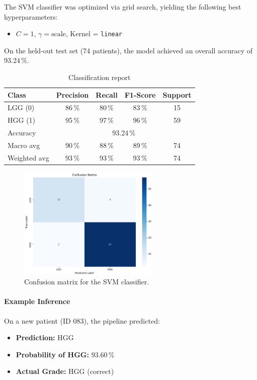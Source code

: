 The SVM classifier was optimized via grid search, yielding the following best hyperparameters:
\begin{itemize}
  \item \(C = 1\), \(\gamma = \text{scale}\), Kernel = \texttt{linear}
\end{itemize}
On the held‐out test set (74 patients), the model achieved an overall accuracy of 93.24\,\%.


\begin{table}[ht]
  \centering
  \caption{Classification report}
  \label{tab:svm-report}
  \begin{tabular}{lcccc}
    \hline
    Class        & Precision                     & Recall & F1-Score & Support \\
    \hline
    LGG (0)      & 86\,\%                        & 80\,\% & 83\,\%   & 15      \\
    HGG (1)      & 95\,\%                        & 97\,\% & 96\,\%   & 59      \\
    \hline
    Accuracy     & \multicolumn{4}{c}{93.24\,\%}                               \\
    Macro avg    & 90\,\%                        & 88\,\% & 89\,\%   & 74      \\
    Weighted avg & 93\,\%                        & 93\,\% & 93\,\%   & 74      \\
    \hline
  \end{tabular}
\end{table}

\begin{figure}[H]
  \centering
  \includegraphics[width=0.6\textwidth]{Images/Chapter3/confusion.png}
  \caption{Confusion matrix for the SVM classifier.}
  \label{fig:confusion}
\end{figure}

\paragraph{Example Inference}
On a new patient (ID 083), the pipeline predicted:
\begin{itemize}
  \item \textbf{Prediction:} HGG
  \item \textbf{Probability of HGG:} 93.60\,\%
  \item \textbf{Actual Grade:} HGG (correct)
\end{itemize}

